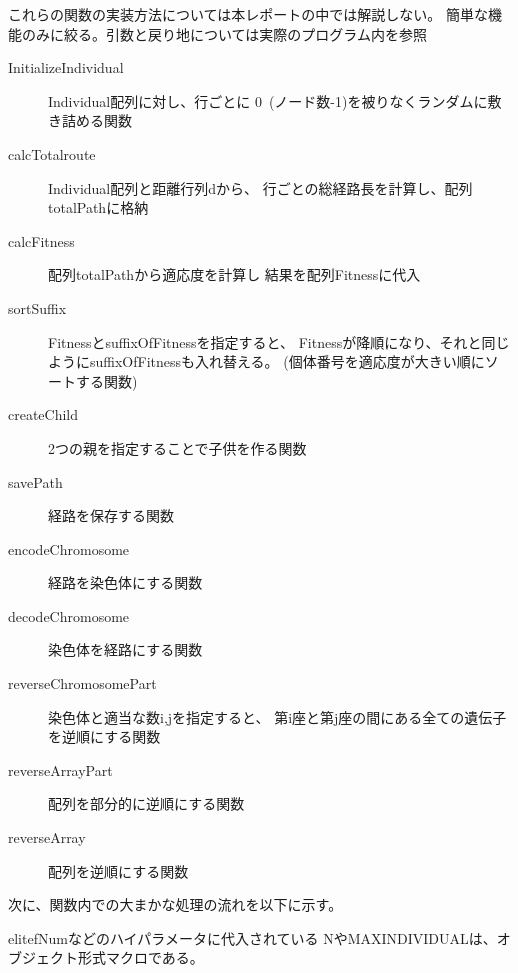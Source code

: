 \documentclass[9pt]{ltjsarticle}
\begin{document}
これらの関数の実装方法については本レポートの中では解説しない。
簡単な機能のみに絞る。引数と戻り地については実際のプログラム内を参照
\begin{tcolorbox}[title=GeneticAlgorithmソルバの内部関数]
\begin{description}
    \item[InitializeIndividual]Individual配列に対し、行ごとに
    0~(ノード数-1)を被りなくランダムに敷き詰める関数
    \item[calcTotalroute]Individual配列と距離行列dから、
    行ごとの総経路長を計算し、配列totalPathに格納
    \item[calcFitness]配列totalPathから適応度を計算し
    結果を配列Fitnessに代入
    \item[sortSuffix]FitnessとsuffixOfFitnessを指定すると、
    Fitnessが降順になり、それと同じようにsuffixOfFitnessも入れ替える。
    (個体番号を適応度が大きい順にソートする関数)
    \item[createChild]2つの親を指定することで子供を作る関数
    \item[savePath]経路を保存する関数
    \item[encodeChromosome]経路を染色体にする関数
    \item[decodeChromosome]染色体を経路にする関数
    \item[reverseChromosomePart]染色体と適当な数i,jを指定すると、
    第i座と第j座の間にある全ての遺伝子を逆順にする関数
    \item[reverseArrayPart]配列を部分的に逆順にする関数
    \item[reverseArray]配列を逆順にする関数
\end{description}
\end{tcolorbox}

次に、関数内での大まかな処理の流れを以下に示す。
\begin{center}
\end{center}

elitefNumなどのハイパラメータに代入されている
NやMAXINDIVIDUALは、オブジェクト形式マクロである。
\end{document}
